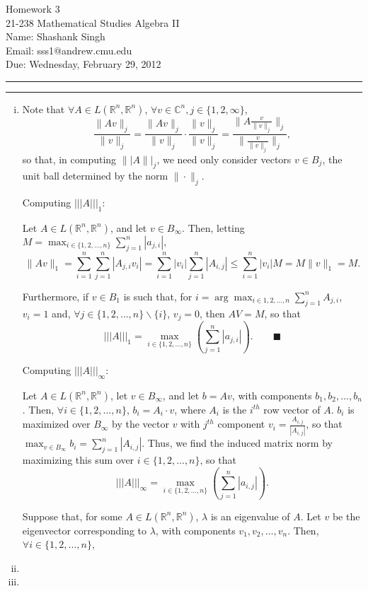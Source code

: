 \documentclass[11pt]{article}
\makeatletter
\newcounter{questionCounter}
\newcounter{partCounter}[questionCounter]
\newenvironment{question}[2][\arabic{questionCounter}]{%
    \setcounter{partCounter}{0}%
    \vspace{.25in} \hrule \vspace{0.5em}%
        \noindent{\bf #2}%
    \vspace{0.8em} \hrule \vspace{.10in}%
    \addtocounter{questionCounter}{1}%
}{}
\newcommand{\myname}{Shashank Singh}
\newcommand{\myandrew}{sss1@andrew.cmu.edu}
\newcommand{\myclass}{21-238 Mathematical Studies Algebra II}
\newcommand{\myhwnum}{3}
\newcommand{\duedate}{Wednesday, February 29, 2012}
\makeatother
\begin{document}
\thispagestyle{plain}

{\Large Homework \myhwnum} \\
\myclass \\
Name: \myname \\
Email: \myandrew \\
Due: \duedate

\begin{question}{Exercise 11}
\begin{enumerate}[i)]
\item Note that $\forall A \in L(\mathbb{R}^n,\mathbb{R}^n)$,
$\forall v \in \mathbb{C}^n, j \in \{1,2,\infty\}$,
\[\frac{\|Av\|_j}{\|v\|_j} =
\frac{\|Av\|_j}{\|v\|_j}\cdot\frac{\|v\|_j}{\|v\|_j}
= \frac{\|A\frac{v}{\|v\|_j}\|_j}{\|\frac{v}{\|v\|_j}\|_j},\] so that,
in computing $\||A\||_j$, we need only consider vectors $v \in B_j$, the unit
ball determined by the norm $\|\cdot\|_j$.

Computing $|||A|||_1$:

Let $A \in L(\mathbb{R}^n,\mathbb{R}^n)$, and let $v \in B_{\infty}$.
Then, letting $M = \max_
{i \in \{1,2,\ldots,n\}} \sum_{j = 1}^n |a_{j,i}|,$
\[\|Av\|_1 = \sum_{i = 1}^n \sum_{j = 1}^n |A_{j,i}v_i| = \sum_{i = 1}^n |v_i| \sum_{j = 1}^n |A_{i,j}|
 \leq \sum_{i = 1}^n |v_i| M = M \|v\|_1 = M.\]

Furthermore, if $v \in B_1$ is such that,
for $i = \arg \max_{i \in {1,2,\ldots,n}} \sum_{j = 1}^n A_{j,i}$, $v_i = 1$ and,
$\forall j \in \{1,2,\ldots,n\}\backslash\{i\}$, $v_j = 0$, then $AV = M$, so that
\[|||A|||_1
 = \displaystyle \max_{i \in \{1,2,\ldots,n\}} \left(\sum_{j = 1}^n |a_{j,i}|\right). \qquad \blacksquare\]

Computing $|||A|||_{\infty}$:

Let $A \in L(\mathbb{R}^n,\mathbb{R}^n)$, let $v \in B_{\infty}$,
and let $b = Av$, with components $b_1,b_2,\ldots,b_n$. Then,
$\forall i \in \{1,2,\ldots,n\}$, $b_i = A_i \cdot v$, where $A_i$ is the
$i^{th}$ row vector of $A$. $b_i$ is maximized over $B_{\infty}$ by the vector
$v$ with $j^{th}$ component $v_i = \frac{A_{i,j}}{|A_{i,j}|}$, so that
$\max_{v \in B_{\infty}} b_i = \sum_{j = 1}^n |A_{i,j}|$. Thus, we find the
induced matrix norm by maximizing this sum over $i \in \{1,2,\ldots,n\}$, so that
\[|||A|||_{\infty}
 = \max_{i \in \{1,2,\ldots,n\}} \left(\sum_{j = 1}^n |a_{i,j}|\right).\]

Suppose that, for some $A \in L(\mathbb{R}^n,\mathbb{R}^n)$, $\lambda$ is an
eigenvalue of $A$. Let $v$ be the eigenvector corresponding to $\lambda$, with
components $v_1,v_2,\ldots,v_n$. Then, $\forall i \in \{1,2,\ldots,n\}$, %

\item

\item
\end{enumerate}
\end{question}
\end{document}
